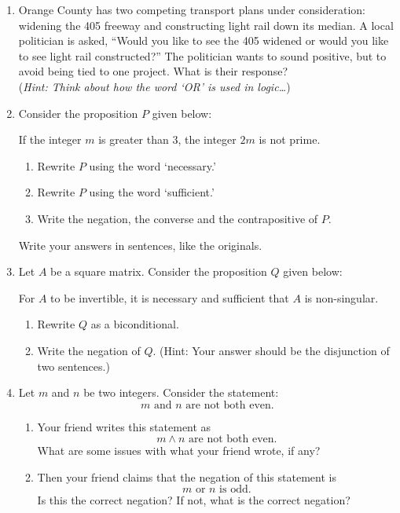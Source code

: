 \begin{enumerate}
  \item Orange County has two competing transport plans under consideration: widening the 405 freeway and constructing light rail down its median. A local politician is asked, ``Would you like to see the 405 widened or would you like to see light rail constructed?'' The politician wants to sound positive, but to avoid being tied to one project. What is their response?\\
  (\emph{Hint: Think about how the word `OR' is used in logic\ldots})
  
  \item Consider the proposition $P$ given below: 
  	\begin{center}
  		If the integer $m$ is greater than 3, the integer $2m$ is not prime.
  	\end{center}
  \begin{enumerate}
    \item Rewrite $P$ using the word `necessary.'
 \item Rewrite $P$ using the word  `sufficient.'
 \item Write the negation, the converse and the contrapositive of $P$. 
  \end{enumerate}
   Write your answers in sentences, like the originals.

   
  \item Let $A$ be a square matrix. 
  Consider the proposition $Q$ given below: 
  	\begin{center}
  		For $A$ to be invertible, it is necessary and sufficient that $A$ is non-singular.
  	\end{center}
   \begin{enumerate}
    \item Rewrite $Q$ as a biconditional. 
  	\item Write the negation of $Q$. (Hint: Your answer should be the disjunction of two sentences.)
   
  \end{enumerate} 
  
  \item Let $m$ and $n$ be two integers. Consider the statement:
  \[
        m \text{ and } n \text{ are not both even}.
  \]
  \begin{enumerate}
      \item Your friend writes this statement as 
      \[
         m \land n \text{ are not both even}.
      \]
      What are some issues with what your friend wrote, if any?
      \item Then your friend claims that the negation of this statement is
      \[
         m \text{ or } n \text{ is odd}.
      \]
      Is this the correct negation? If not, what is the correct negation?
  \end{enumerate}
  

\end{enumerate}
